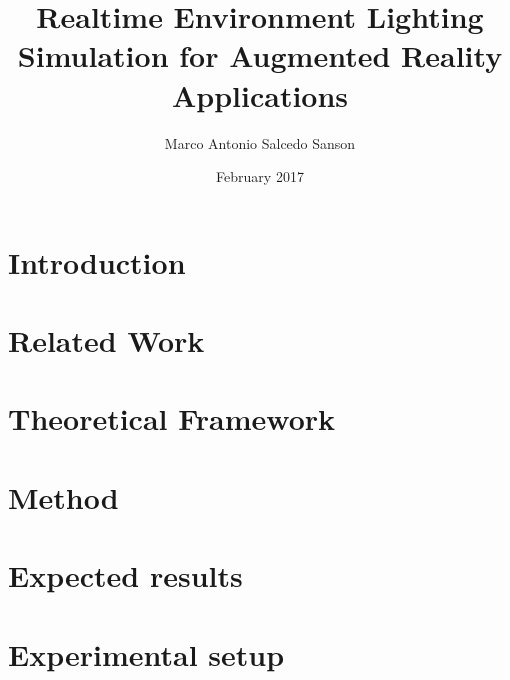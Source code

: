 \documentclass{article}
\title{Realtime Environment Lighting Simulation for Augmented Reality  Applications}
\author{Marco Antonio Salcedo Sanson }
\date{February 2017}
\begin{document}
\maketitle

\section{Introduction}



\section{Related Work}


\section{Theoretical Framework}


\section{Method}


\section{Expected results}


\section{Experimental setup}


\clearpage


\nocite{*}

\end{document}
